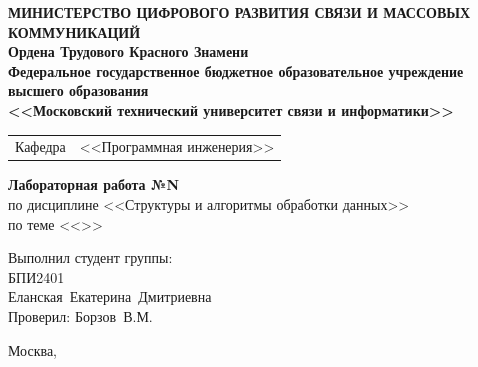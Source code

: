 \thispagestyle{empty}

\begin{center}
	\textbf{МИНИСТЕРСТВО ЦИФРОВОГО РАЗВИТИЯ СВЯЗИ И МАССОВЫХ КОММУНИКАЦИЙ} \\
	\textbf{Ордена Трудового Красного Знамени \\
		Федеральное государственное бюджетное образовательное учреждение высшего образования \\
		<<Московский технический университет связи и информатики>>}
\end{center}

\vspace{0.3em}

\begin{center}
	\begin{tabularx}{0.5\textwidth}{p{1.2cm}X}
		Кафедра & \quad <<Программная инженерия>> \\%
	\end{tabularx}
\end{center}

\vspace{12em}

\begin{center}
	\Large
	\textbf{Лабораторная работа №N} \\
	\large
	по дисциплине <<Структуры и алгоритмы обработки данных>> \\
	по теме <<>>
\end{center}

\vspace{3em}

\begin{flushright}
	Выполнил студент группы: \\
	БПИ2401 \\
	Еланская~Екатерина~Дмитриевна\\
	Проверил: Борзов~В.М.\\
\end{flushright}

\vspace{8em}

\begin{center}
	Москва,~\the\year
\end{center}
\clearpage

